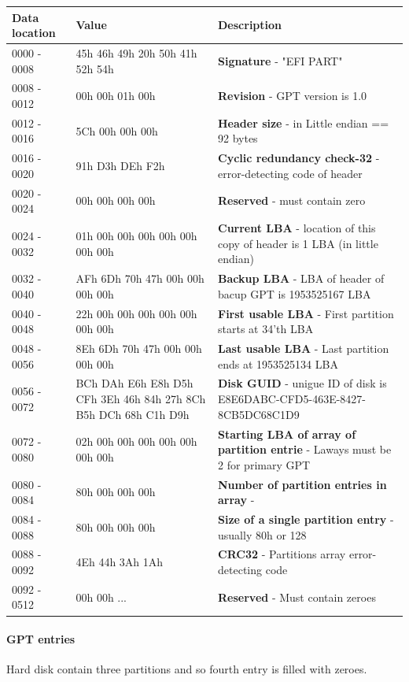 \documentclass[a4paper,11pt]{article}
\theoremstyle{mytheor}
\begin{document}
\begin{longtable}{| p{3cm} | p{2cm} | p{10cm} |} \hline
  Data location & Value & Description\\ \hline
  0000 - 0008 & 45h 46h 49h 20h 50h 41h 52h 54h & \textbf{Signature} - "EFI PART"\\ \hline
  0008 - 0012 & 00h 00h 01h 00h & \textbf{Revision} - GPT version is 1.0\\ \hline
  0012 - 0016 & 5Ch 00h 00h 00h & \textbf{Header size} - in Little endian == 92 bytes\\ \hline
  0016 - 0020 & 91h D3h DEh F2h & \textbf{Cyclic redundancy check-32} - error-detecting code of header\\ \hline
  0020 - 0024 & 00h 00h 00h 00h & \textbf{Reserved} - must contain zero\\ \hline
  0024 - 0032 & 01h 00h 00h 00h 00h 00h 00h 00h & \textbf{Current LBA} - location of this copy of header is 1 LBA (in little endian)\\ \hline
  0032 - 0040 & AFh 6Dh 70h 47h 00h 00h 00h 00h & \textbf{Backup LBA} - LBA of header of bacup GPT is 1953525167 LBA\\ \hline
  0040 - 0048 & 22h 00h 00h 00h 00h 00h 00h 00h & \textbf{First usable LBA} - First partition starts at 34'th LBA\\ \hline
  0048 - 0056 & 8Eh 6Dh 70h 47h 00h 00h 00h 00h & \textbf{Last usable LBA} - Last partition ends at 1953525134 LBA\\ \hline
  0056 - 0072 & BCh DAh E6h E8h D5h CFh 3Eh 46h 84h 27h 8Ch B5h DCh 68h C1h D9h & \textbf{Disk GUID} - unigue ID of disk is E8E6DABC-CFD5-463E-8427-8CB5DC68C1D9\\ \hline
  0072 - 0080 & 02h 00h 00h 00h 00h 00h 00h 00h & \textbf{Starting LBA of array of partition entrie} - Laways must be 2 for primary GPT\\ \hline
  0080 - 0084 & 80h 00h 00h 00h & \textbf{Number of partition entries in array} - \\ \hline
  0084 - 0088 & 80h 00h 00h 00h & \textbf{Size of a single partition entry} - usually 80h or 128\\ \hline
  0088 - 0092 & 4Eh 44h 3Ah 1Ah & \textbf{CRC32} - Partitions array error-detecting code\\ \hline
  0092 - 0512 & 00h 00h ... & \textbf{Reserved} - Must contain zeroes\\ \hline


\end{longtable}

\paragraph{GPT entries}
Hard disk contain three partitions and so fourth entry is filled with zeroes. 
\end{document}
